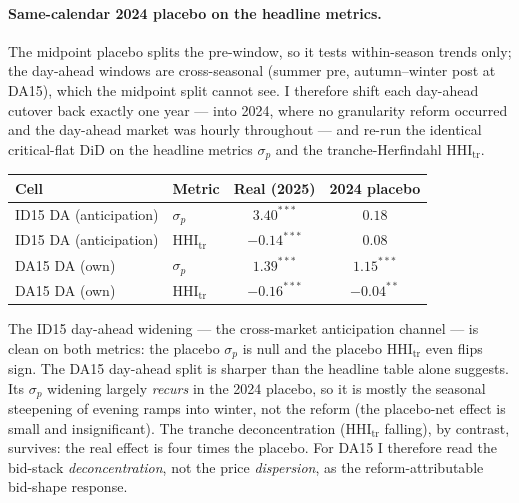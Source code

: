 \documentclass[11pt,a4paper]{article}
\theoremstyle{definition}
\theoremstyle{remark}
\theoremstyle{plain}
\begin{document}
\paragraph{Same-calendar 2024 placebo on the headline metrics.} The midpoint placebo splits the pre-window, so it tests within-season trends only; the day-ahead windows are cross-seasonal (summer pre, autumn--winter post at DA15), which the midpoint split cannot see. I therefore shift each day-ahead cutover back exactly one year --- into 2024, where no granularity reform occurred and the day-ahead market was hourly throughout --- and re-run the identical critical-flat DiD on the headline metrics $\sigma_p$ and the tranche-Herfindahl $\text{HHI}_{\text{tr}}$.

\begin{center}
\footnotesize
\setlength{\tabcolsep}{8pt}
\begin{tabular}{l l c c}
\toprule
\textbf{Cell} & \textbf{Metric} & \textbf{Real (2025)} & \textbf{2024 placebo} \\
\midrule
ID15 DA (anticipation) & $\sigma_p$               & $\mathbf{3.40}^{***}$  & $0.18$ \\
ID15 DA (anticipation) & $\text{HHI}_{\text{tr}}$  & $\mathbf{-0.14}^{***}$ & $0.08$ \\
DA15 DA (own)          & $\sigma_p$               & $1.39^{***}$           & $1.15^{***}$ \\
DA15 DA (own)          & $\text{HHI}_{\text{tr}}$  & $\mathbf{-0.16}^{***}$ & $-0.04^{**}$ \\
\bottomrule
\end{tabular}
\label{tab:placebo-2024}
\end{center}

The ID15 day-ahead widening --- the cross-market anticipation channel --- is clean on both metrics: the placebo $\sigma_p$ is null and the placebo $\text{HHI}_{\text{tr}}$ even flips sign. The DA15 day-ahead split is sharper than the headline table alone suggests. Its $\sigma_p$ widening largely \emph{recurs} in the 2024 placebo, so it is mostly the seasonal steepening of evening ramps into winter, not the reform (the placebo-net effect is small and insignificant). The tranche deconcentration ($\text{HHI}_{\text{tr}}$ falling), by contrast, survives: the real effect is four times the placebo. For DA15 I therefore read the bid-stack \emph{deconcentration}, not the price \emph{dispersion}, as the reform-attributable bid-shape response.
\end{document}
